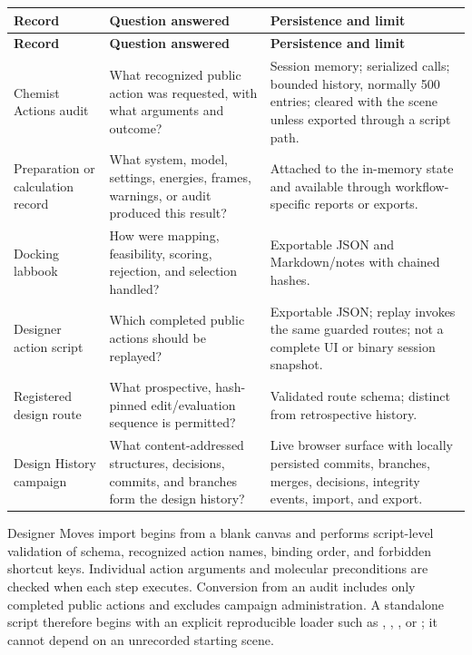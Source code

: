 \begingroup
\footnotesize
\begin{longtable}{@{}p{1.23in}p{2.76in}p{2.61in}@{}}
\toprule
\textbf{Record} & \textbf{Question answered} & \textbf{Persistence and limit}\\
\midrule
\endfirsthead
\toprule
\textbf{Record} & \textbf{Question answered} & \textbf{Persistence and limit}\\
\midrule
\endhead
Chemist Actions audit & What recognized public action was requested, with what arguments and outcome? & Session memory; serialized calls; bounded history, normally 500 entries; cleared with the scene unless exported through a script path.\\
Preparation or calculation record & What system, model, settings, energies, frames, warnings, or audit produced this result? & Attached to the in-memory state and available through workflow-specific reports or exports.\\
Docking labbook & How were mapping, feasibility, scoring, rejection, and selection handled? & Exportable JSON and Markdown/notes with chained hashes.\\
Designer action script & Which completed public actions should be replayed? & Exportable JSON; replay invokes the same guarded routes; not a complete UI or binary session snapshot.\\
Registered design route & What prospective, hash-pinned edit/evaluation sequence is permitted? & Validated route schema; distinct from retrospective history.\\
Design History campaign & What content-addressed structures, decisions, commits, and branches form the design history? & Live browser surface with locally persisted commits, branches, merges, decisions, integrity events, import, and export.\\
\bottomrule
\end{longtable}
\endgroup


Designer Moves import begins from a blank canvas and performs script-level validation of schema, recognized action names, binding order, and forbidden shortcut keys. Individual action arguments and molecular preconditions are checked when each step executes. Conversion from an audit includes only completed public actions and excludes campaign administration. A standalone script therefore begins with an explicit reproducible loader such as , , , or ; it cannot depend on an unrecorded starting scene.

